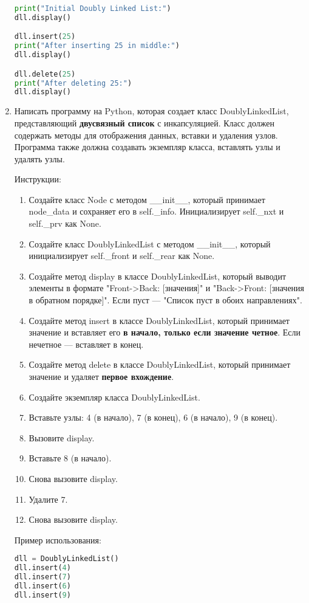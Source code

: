 \begin{enumerate}
\begin{lstlisting}[language=Python]
print("Initial Doubly Linked List:")
dll.display()

dll.insert(25)
print("After inserting 25 in middle:")
dll.display()

dll.delete(25)
print("After deleting 25:")
dll.display()
\end{lstlisting}

\item Написать программу на Python, которая создает класс DoublyLinkedList, представляющий \textbf{двусвязный список} с инкапсуляцией. Класс должен содержать методы для отображения данных, вставки и удаления узлов. Программа также должна создавать экземпляр класса, вставлять узлы и удалять узлы.

Инструкции:
\begin{enumerate}
    \item Создайте класс Node с методом \_\_init\_\_, который принимает node\_data и сохраняет его в self.\_info. Инициализирует self.\_nxt и self.\_prv как None.
    \item Создайте класс DoublyLinkedList с методом \_\_init\_\_, который инициализирует self.\_front и self.\_rear как None.
    \item Создайте метод display в классе DoublyLinkedList, который выводит элементы в формате "Front->Back: [значения]" и "Back->Front: [значения в обратном порядке]". Если пуст — "Список пуст в обоих направлениях".
    \item Создайте метод insert в классе DoublyLinkedList, который принимает значение и вставляет его \textbf{в начало, только если значение четное}. Если нечетное — вставляет в конец.
    \item Создайте метод delete в классе DoublyLinkedList, который принимает значение и удаляет \textbf{первое вхождение}.
    \item Создайте экземпляр класса DoublyLinkedList.
    \item Вставьте узлы: 4 (в начало), 7 (в конец), 6 (в начало), 9 (в конец).
    \item Вызовите display.
    \item Вставьте 8 (в начало).
    \item Снова вызовите display.
    \item Удалите 7.
    \item Снова вызовите display.
\end{enumerate}

Пример использования:
\begin{lstlisting}[language=Python]
dll = DoublyLinkedList()
dll.insert(4)
dll.insert(7)
dll.insert(6)
dll.insert(9)


\end{lstlisting}
\end{enumerate}

